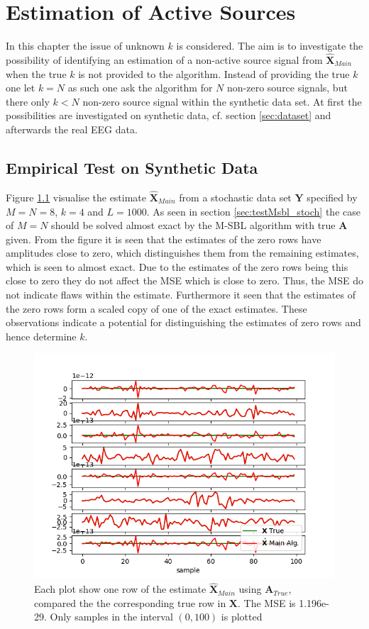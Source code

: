 \chapter{Estimation of Active Sources}\label{ch:estimation_k}
In this chapter the issue of unknown $k$ is considered. The aim is to investigate the possibility of identifying an estimation of a non-active source signal from $\hat{\textbf{X}}_{Main}$ when the true $k$ is not provided to the algorithm. Instead of providing the true $k$ one let $k=N$ as such one ask the algorithm for $N$ non-zero source signals, but there only $k<N$ non-zero source signal within the synthetic data set. 
At first the possibilities are investigated on synthetic data, cf. section \ref{sec:dataset} and afterwards the real EEG data.   

\section{Empirical Test on Synthetic Data}
Figure \ref{fig:ktest1} visualise the estimate $\hat{\textbf{X}}_{Main}$ from a stochastic data set $\textbf{Y}$ specified by $M=N=8$, $k=4$ and $L=1000$. 
As seen in section \ref{sec:testMsbl_stoch} the case of $M=N$ should be solved almost exact by the M-SBL algorithm with true $\textbf{A}$ given. From the figure it is seen that the estimates of the zero rows have amplitudes close to zero, which distinguishes them from the remaining estimates, which is seen to almost exact. Due to the estimates of the zero rows being this close to zero they do not affect the MSE which is close to zero. Thus, the MSE do not indicate flaws within the estimate. 
Furthermore it seen that the estimates of the zero rows form a scaled copy of one of the exact estimates. These observations indicate a potential for distinguishing the estimates of zero rows and hence determine $k$.     
\begin{figure}[H]
    \centering
	\includegraphics[scale=0.5]{figures/ch_estimate/k_test1.png}
	\caption{Each plot show one row of the estimate $\hat{\textbf{X}}_{Main}$ using $\textbf{A}_{True}$, compared the the corresponding true row in $\textbf{X}$. The MSE is 1.196e-29. Only samples in the interval $(0,100)$ is plotted}
	\label{fig:ktest1}
\end{figure}
